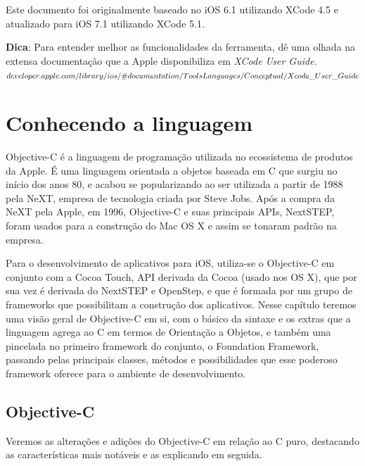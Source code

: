 \documentclass[a4paper,12pt,brazil,doubleside]{book}
\begin{document}
\begin{singlespace}
Este documento foi originalmente baseado no iOS 6.1 utilizando XCode 4.5 e atualizado para iOS 7.1 utilizando XCode 5.1.

\begin{framed}
\textbf{Dica}: Para entender melhor as funcionalidades da ferramenta, dê uma olhada na extensa documentação que a Apple disponibiliza em 
\textit{XCode User Guide.\\
\(developer.apple.com/library/ios/\#documentation/ToolsLanguages/Conceptual/\\Xcode\_User\_Guide\)}
\end{framed}

\chapter{Conhecendo a linguagem}



Objective-C é a linguagem de programação utilizada no ecossistema de produtos da Apple. É uma linguagem orientada a objetos baseada em C que surgiu no início dos anos 80, e acabou se popularizando ao ser utilizada a partir de 1988 pela NeXT, empresa de tecnologia criada por Steve Jobs. Após a compra da NeXT pela Apple, em 1996, Objective-C e suas principais APIs, NextSTEP, foram usados para a construção do Mac OS X e assim se tonaram padrão na empresa.

Para o desenvolvimento de aplicativos para iOS, utiliza-se o Objective-C em conjunto com a Cocoa Touch, API derivada da Cocoa (usado nos OS X), que por sua vez é derivada do NextSTEP e OpenStep, e que é formada por um grupo de frameworks que possibilitam a construção dos aplicativos. Nesse capítulo teremos uma visão geral de Objective-C em si, com o básico da sintaxe e os extras que a linguagem agrega ao C em termos de Orientação a Objetos, e também uma pincelada no primeiro framework do conjunto, o Foundation Framework, passando pelas principais classes, métodos e possibilidades que esse poderoso framework oferece para o ambiente de desenvolvimento.



\bigskip


\section{Objective-C}


Veremos as alterações e adições do Objective-C em relação ao C puro, destacando as características mais notáveis e as explicando em seguida.


\end{singlespace}
\end{document}
